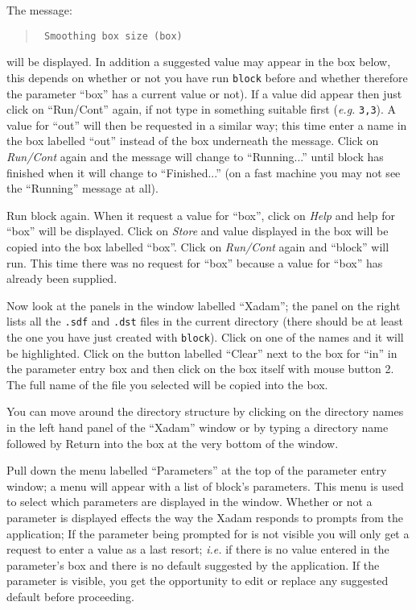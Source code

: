 \begin{list}{ 
}{\setlength{\rightmargin}{\leftmargin}}
The message:
\begin{quote}\tt
Smoothing box size (box)
\end{quote}

will be displayed. In addition a suggested value may appear in the box
below, this depends on whether or not you have run {\tt block} before
and whether therefore the parameter ``box'' has a current value or
not). If a value did appear then just click on ``Run/Cont'' again, if
not type in something suitable first ({\em e.g.}\/ {\tt 3,3}).  A
value for ``out'' will then be requested in a similar way; this time
enter a name in the box labelled ``out'' instead of the box underneath
the message. Click on {\em Run/Cont} again and the message will change
to ``Running...'' until block has finished when it will change to
``Finished...'' (on a fast machine you may not see the ``Running''
message at all).

\item Run block again. When it request a value for ``box'', click on
{\em Help} and help for ``box'' will be displayed. Click on {\em Store}
and value displayed in the box will be copied into the box labelled
``box''.  Click on {\em Run/Cont} again and ``block'' will run. This
time there was no request for ``box'' because a value for ``box'' has
already been supplied.

\item Now look at the panels in the window labelled ``Xadam''; the
panel on the right lists all the {\tt .sdf} and {\tt .dst} files in the
current directory (there should be at least the one you have just
created with {\tt block}).  Click on one of the names and it will be
highlighted.  Click on the button labelled ``Clear'' next to the box
for ``in'' in the parameter entry box and then click on the box itself
with mouse button 2. The full name of the file you selected will be
copied into the box.

You can move around the directory structure by clicking on the
directory names in the left hand panel of the ``Xadam'' window or by
typing a directory name followed by Return into the box at the very
bottom of the window.

\item Pull down the menu labelled ``Parameters'' at the top of the
parameter entry window; a menu will appear with a list of block's
parameters.  This menu is used to select which parameters are displayed
in the window. Whether or not a parameter is displayed effects the way
the Xadam responds to prompts from the application; If the parameter
being prompted for is not visible you will only get a request to enter
a value as a last resort; {\em i.e.}\/ if there is no value entered in
the parameter's box and there is no default suggested by the
application.  If the parameter is visible, you get the opportunity to
edit or replace any suggested default before proceeding.


\end{list}
